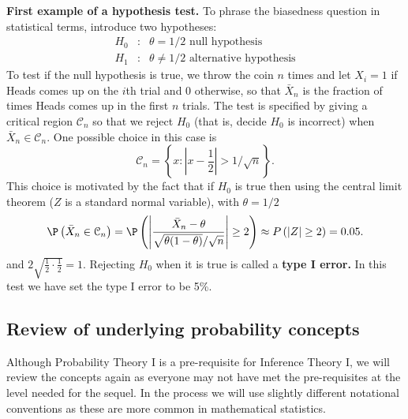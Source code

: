 \textbf{First example of a hypothesis test.} To phrase the biasedness
question in statistical terms, introduce two hypotheses: 
\begin{eqnarray*}
H_{0} &:&\theta=1/2\text{ null hypothesis} \\
H_{1} &:&\theta\neq 1/2\text{ alternative hypothesis}
\end{eqnarray*}%
To test if the null hypothesis 
 is true, we throw the coin $n$ times and let $%
X_{i}=1 $ if Heads comes up on the $i$th trial and $0$ otherwise, so that $%
\bar{X}_{n}$ is the fraction of times Heads comes up in the first $n$
trials. The test is specified by giving a critical region \textbf{%
 }$\mathcal{C}_{n}$ so that we reject $H_{0}$ (that
is, decide $H_{0}$ is incorrect) when $%
\bar{X}_{n}\in \mathcal{C}_{n}$. One possible choice in this case is 
\begin{equation*}
\mathcal{C}_{n}=\left\{ x:\left\vert x-\frac{1}{2}\right\vert >1/\sqrt{n}%
\right\} .
\end{equation*}%
This choice is motivated by the fact that if $H_{0}$ is true then using the
central limit theorem ($Z$ is a standard normal variable), with $\theta=1/2$ 
\begin{equation}
\P \left( \bar{X}_{n}\in \mathcal{C}_{n}\right) =\P \left( \left\vert 
\frac{\bar{X}_{n}-\theta}{\sqrt{\theta(1-\theta)}/\sqrt{n}}\right\vert \geq 2\right)
\approx P\left( \left\vert Z\right\vert \geq 2\right) =0.05.
\end{equation}%
and $2\sqrt{\frac{1}{2}\cdot \frac{1}{2}}=1$. Rejecting $H_{0}$ when it is
true is called a \textbf{type I error. 
}In this test we have set the type I error to be 5\%.

\bigskip \bigskip

\subsection{Review of underlying probability concepts}

Although Probability Theory I is a pre-requisite for Inference Theory I, we will review the concepts again as everyone may not have met the pre-requisites at the level needed for the sequel. 
In the process we will use slightly different notational conventions as these are more common in mathematical statistics.


